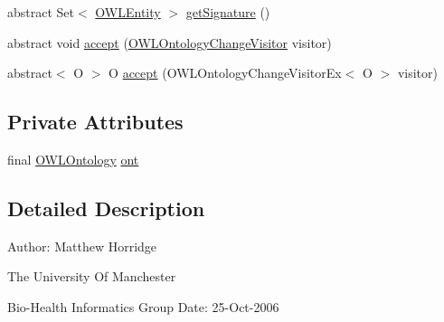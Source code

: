 \begin{DoxyCompactItemize}
\item 
abstract Set$<$ \hyperlink{interfaceorg_1_1semanticweb_1_1owlapi_1_1model_1_1_o_w_l_entity}{O\-W\-L\-Entity} $>$ \hyperlink{classorg_1_1semanticweb_1_1owlapi_1_1model_1_1_o_w_l_ontology_change_ab1412519658118242ad313a6cd86e200}{get\-Signature} ()
\item 
abstract void \hyperlink{classorg_1_1semanticweb_1_1owlapi_1_1model_1_1_o_w_l_ontology_change_a513e55085658c7385b529e1ce1d428c9}{accept} (\hyperlink{interfaceorg_1_1semanticweb_1_1owlapi_1_1model_1_1_o_w_l_ontology_change_visitor}{O\-W\-L\-Ontology\-Change\-Visitor} visitor)
\item 
abstract$<$ O $>$ O \hyperlink{classorg_1_1semanticweb_1_1owlapi_1_1model_1_1_o_w_l_ontology_change_aa6531507c525a2ff07bdf82d78143fc2}{accept} (O\-W\-L\-Ontology\-Change\-Visitor\-Ex$<$ O $>$ visitor)
\end{DoxyCompactItemize}
\subsection*{Private Attributes}
\begin{DoxyCompactItemize}
\item 
final \hyperlink{interfaceorg_1_1semanticweb_1_1owlapi_1_1model_1_1_o_w_l_ontology}{O\-W\-L\-Ontology} \hyperlink{classorg_1_1semanticweb_1_1owlapi_1_1model_1_1_o_w_l_ontology_change_a9b8b64f1cab33aae500db20e19186211}{ont}
\end{DoxyCompactItemize}


\subsection{Detailed Description}
Author\-: Matthew Horridge\par
 The University Of Manchester\par
 Bio-\/\-Health Informatics Group Date\-: 25-\/\-Oct-\/2006 

